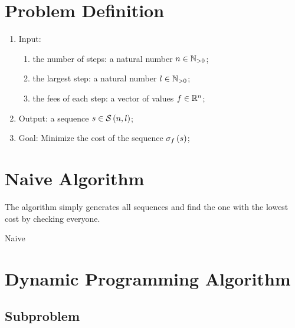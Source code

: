 \section{Problem Definition}

\begin{enumerate}
    \item Input:
    \begin{enumerate}
        \item the number of steps: a natural number $n \in \mathbb{N}_{>0}$;
        \item the largest step: a natural number $l \in \mathbb{N}_{>0}$;
        \item the fees of each step: a vector of values $f \in \mathbb{R}^{n}$;
    \end{enumerate}
    \item Output: a sequence $s \in \mathcal{S} \left( n, l \right)$;
    \item Goal: Minimize the cost of the sequence $\sigma_{f} \left( s \right)$;
\end{enumerate}

\section{Naive Algorithm}

The algorithm simply generates all sequences and find the one with the lowest cost by checking everyone.

\begin{algorithm}[H]
    \caption{Naive}
    \label{stairway-to-heaven-2:algorithm:naive}
    \begin{algorithmic}[1]
        \Require{$\nSteps \in \oneN, \stepLimit \in \oneN, \fees \in \R^\nSteps$}
    \end{algorithmic}
\end{algorithm}

\section{Dynamic Programming Algorithm}

\subsection{Subproblem}


